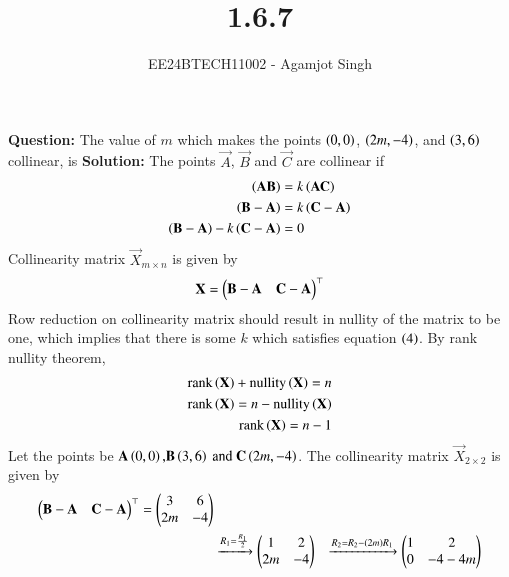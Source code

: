 \documentclass[journal]{IEEEtran}
\begin{document}

\vspace{3cm}

\title{1.6.7}
\author{EE24BTECH11002 - Agamjot Singh
}
{\let\newpage\relax\maketitle}

\renewcommand{\thefigure}{\theenumi}
\renewcommand{\thetable}{\theenumi}
\setlength{\intextsep}{10pt} %

\textbf{Question:}
\newline
The value of $m$ which makes the points $\left(0, 0\right)$, $\left(2m, -4\right)$, and $\left(3,6\right)$ collinear, is
\newline
\textbf{Solution:}
\newline
The points $\vec{A}$, $\vec{B}$ and $\vec{C}$ are collinear if
\begin{align}
	\left(\mathbf{AB}\right) &= k\left(\mathbf{AC}\right)\\
	\left(\mathbf{B} - \mathbf{A}\right) &= k\left(\mathbf{C} - \mathbf{A}\right)\\
	\left(\mathbf{B} - \mathbf{A}\right) - k\left(\mathbf{C} - \mathbf{A}\right) &= 0
\end{align}
Collinearity matrix $\vec{X}_{m\times n}$ is given by
\begin{align}
	\mathbf{X} = \begin{pmatrix}\mathbf{B} - \mathbf{A} & \mathbf{C} - \mathbf{A}\end{pmatrix}^\top 
\end{align}
Row reduction on collinearity matrix should result in nullity of the matrix to be one, which implies that there is some $k$ which satisfies equation $\left(4\right)$.
\newline
By rank nullity theorem,
\begin{align}
	\text{rank}\left(\mathbf{X}\right) + \text{nullity}\left(\mathbf{X}\right) = n\\
	\text{rank}\left(\mathbf{X}\right) = n - \text{nullity}\left(\mathbf{X}\right)\\
	\text{rank}\left(\mathbf{X}\right) = n - 1
\end{align}
\newline
Let the points be $\mathbf{A}\left(0, 0\right) \text{,} \mathbf{B}\left(3, 6\right) \text{ and } \mathbf{C}\left(2m, -4\right)$.
The collinearity matrix $\vec{X}_{2\times 2}$ is given by
\begin{align}
	\begin{pmatrix}\mathbf{B} - \mathbf{A} & \mathbf{C} - \mathbf{A}\end{pmatrix}^\top = \begin{pmatrix}3 & 6 \\ 2m & -4\end{pmatrix}\\ 
													   &\xrightarrow{R_1 = \frac{R_1}{2}} \begin{pmatrix}1 & 2\\2m & -4\end{pmatrix}
													   &\xrightarrow{R_2 = R_2 - \left(2m\right)R_1} \begin{pmatrix}1 & 2\\0 & -4-4m\end{pmatrix}
\end{align}
\end{document}
